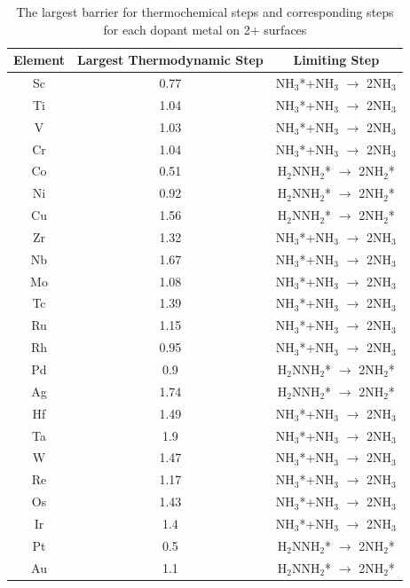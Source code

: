 \documentclass[journal=jacsat,manuscript=article]{achemso}
\begin{document}
\begin{table}
\begin{center}
\begin{tabular}{| c | c |c |}
\hline
Element & Largest Thermodynamic Step & Limiting Step \\
\hline
Sc & 0.77 & NH$_3$*+NH$_3$ $\rightarrow$ 2NH$_3$\\
Ti & 1.04 & NH$_3$*+NH$_3$ $\rightarrow$ 2NH$_3$\\
V & 1.03 & NH$_3$*+NH$_3$ $\rightarrow$ 2NH$_3$\\
Cr & 1.04 & NH$_3$*+NH$_3$ $\rightarrow$ 2NH$_3$\\
Co & 0.51 & H$_2$NNH$_2$* $\rightarrow$ 2NH$_2$*\\
Ni & 0.92 & H$_2$NNH$_2$* $\rightarrow$ 2NH$_2$*\\
Cu & 1.56 & H$_2$NNH$_2$* $\rightarrow$ 2NH$_2$*\\
Zr & 1.32 & NH$_3$*+NH$_3$ $\rightarrow$ 2NH$_3$\\
Nb & 1.67 & NH$_3$*+NH$_3$ $\rightarrow$ 2NH$_3$\\
Mo & 1.08 & NH$_3$*+NH$_3$ $\rightarrow$ 2NH$_3$\\
Tc & 1.39 & NH$_3$*+NH$_3$ $\rightarrow$ 2NH$_3$\\
Ru & 1.15 & NH$_3$*+NH$_3$ $\rightarrow$ 2NH$_3$\\
Rh & 0.95 & NH$_3$*+NH$_3$ $\rightarrow$ 2NH$_3$\\
Pd & 0.9 & H$_2$NNH$_2$* $\rightarrow$ 2NH$_2$*\\
Ag & 1.74 & H$_2$NNH$_2$* $\rightarrow$ 2NH$_2$*\\
Hf & 1.49 & NH$_3$*+NH$_3$ $\rightarrow$ 2NH$_3$\\
Ta & 1.9 & NH$_3$*+NH$_3$ $\rightarrow$ 2NH$_3$\\
W & 1.47 & NH$_3$*+NH$_3$ $\rightarrow$ 2NH$_3$\\
Re & 1.17 & NH$_3$*+NH$_3$ $\rightarrow$ 2NH$_3$\\
Os & 1.43 & NH$_3$*+NH$_3$ $\rightarrow$ 2NH$_3$\\
Ir & 1.4 & NH$_3$*+NH$_3$ $\rightarrow$ 2NH$_3$\\
Pt & 0.5 & H$_2$NNH$_2$* $\rightarrow$ 2NH$_2$*\\
Au & 1.1 & H$_2$NNH$_2$* $\rightarrow$ 2NH$_2$*\\
\hline
\end{tabular}
\end{center}
\caption{The largest barrier for thermochemical steps and corresponding steps for each dopant metal on 2+ surfaces}\label{table:thermo_limiting_steps}\end{table}\begin{table}

\end{table}
\end{document}

